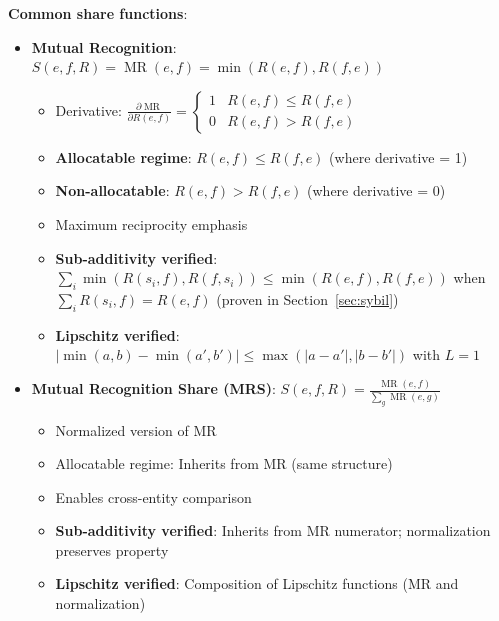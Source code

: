 \documentclass[11pt,a4paper]{article}
\theoremstyle{definition}
\theoremstyle{remark}
\DeclareMathOperator{\MR}{MR}
\begin{document}
\textbf{Common share functions}:
\begin{itemize}
\item \textbf{Mutual Recognition}: $S(e,f,R) = \MR(e,f) = \min(R(e,f), R(f,e))$
  \begin{itemize}
  \item Derivative: $\frac{\partial \MR}{\partial R(e,f)} = \begin{cases} 1 & R(e,f) \le R(f,e) \\ 0 & R(e,f) > R(f,e) \end{cases}$
  \item \textbf{Allocatable regime}: $R(e,f) \le R(f,e)$ (where derivative = 1)
  \item \textbf{Non-allocatable}: $R(e,f) > R(f,e)$ (where derivative = 0)
  \item Maximum reciprocity emphasis
  \item \textbf{Sub-additivity verified}: $\sum_i \min(R(s_i,f), R(f,s_i)) \le \min(R(e,f), R(f,e))$ when $\sum_i R(s_i,f) = R(e,f)$ (proven in Section~\ref{sec:sybil})
  \item \textbf{Lipschitz verified}: $|\min(a,b) - \min(a',b')| \le \max(|a-a'|, |b-b'|)$ with $L=1$
  \end{itemize}

\item \textbf{Mutual Recognition Share (MRS)}: $S(e,f,R) = \frac{\MR(e,f)}{\sum_g \MR(e,g)}$
  \begin{itemize}
  \item Normalized version of MR
  \item Allocatable regime: Inherits from MR (same structure)
  \item Enables cross-entity comparison
  \item \textbf{Sub-additivity verified}: Inherits from MR numerator; normalization preserves property
  \item \textbf{Lipschitz verified}: Composition of Lipschitz functions (MR and normalization)
  \end{itemize}


\end{itemize}
\end{document}
